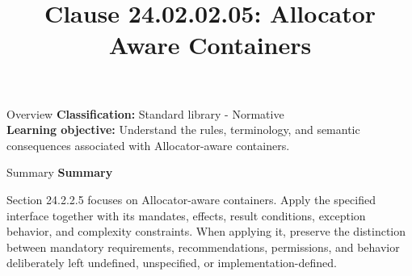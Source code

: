 \documentclass[10pt,letterpaper]{article}
\title{Clause 24.02.02.05: Allocator Aware Containers}
\author{}
\date{}
\begin{document}
\maketitle
\begin{CornellOverviewBox}{Overview}
\textbf{Classification:} Standard library - Normative\\[2pt]
\textbf{Learning objective:} Understand the rules, terminology, and semantic consequences associated with Allocator-aware containers.
\end{CornellOverviewBox}\begin{CornellSummaryBox}{Summary}
{\sffamily\bfseries\color{Accent} Summary}\par\vspace{3pt}Section 24.2.2.5 focuses on Allocator-aware containers. Apply the specified interface together with its mandates, effects, result conditions, exception behavior, and complexity constraints. When applying it, preserve the distinction between mandatory requirements, recommendations, permissions, and behavior deliberately left undefined, unspecified, or implementation-defined.
\end{CornellSummaryBox}
\end{document}
